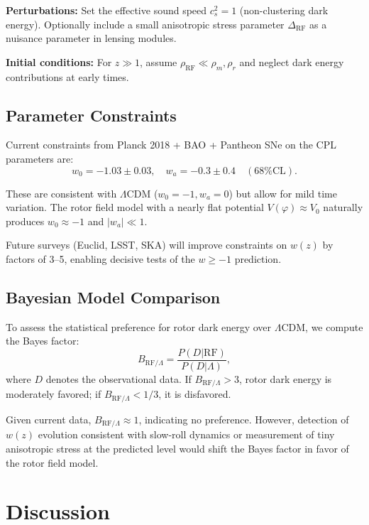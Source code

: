 \documentclass[11pt,a4paper]{article}
\numberwithin{equation}{section}
\theoremstyle{plain}
\theoremstyle{definition}
\theoremstyle{remark}
\begin{document}
\textbf{Perturbations:} Set the effective sound speed $c_s^2 = 1$ (non-clustering dark energy). Optionally include a small anisotropic stress parameter $\Delta_{\mathrm{RF}}$ as a nuisance parameter in lensing modules.

\textbf{Initial conditions:} For $z \gg 1$, assume $\rho_{\mathrm{RF}} \ll \rho_m, \rho_r$ and neglect dark energy contributions at early times.

\subsection{Parameter Constraints}

Current constraints from Planck 2018 + BAO + Pantheon SNe on the CPL parameters are:
\begin{equation}
w_0 = -1.03 \pm 0.03, \quad w_a = -0.3 \pm 0.4\quad (\text{68\% CL}).
\end{equation}

These are consistent with $\Lambda$CDM ($w_0 = -1, w_a = 0$) but allow for mild time variation. The rotor field model with a nearly flat potential $V(\varphi) \approx V_0$ naturally produces $w_0 \approx -1$ and $|w_a| \ll 1$.

Future surveys (Euclid, LSST, SKA) will improve constraints on $w(z)$ by factors of 3--5, enabling decisive tests of the $w \geq -1$ prediction.

\subsection{Bayesian Model Comparison}

To assess the statistical preference for rotor dark energy over $\Lambda$CDM, we compute the Bayes factor:
\begin{equation}
B_{\mathrm{RF}/\Lambda} = \frac{P(D|\mathrm{RF})}{P(D|\Lambda)},
\end{equation}
where $D$ denotes the observational data. If $B_{\mathrm{RF}/\Lambda} > 3$, rotor dark energy is moderately favored; if $B_{\mathrm{RF}/\Lambda} < 1/3$, it is disfavored.

Given current data, $B_{\mathrm{RF}/\Lambda} \approx 1$, indicating no preference. However, detection of $w(z)$ evolution consistent with slow-roll dynamics or measurement of tiny anisotropic stress at the predicted level would shift the Bayes factor in favor of the rotor field model.

\section{Discussion}
\label{sec:discussion}
\end{document}
